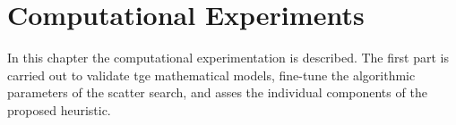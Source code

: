 \chapter{Computational Experiments}
\label{ch:Experiments}
In this chapter
the computational experimentation is described.
The first part
is carried out
to validate
tge mathematical models,
fine-tune
the algorithmic parameters
of the scatter search,
and asses the individual components
of the proposed heuristic.





